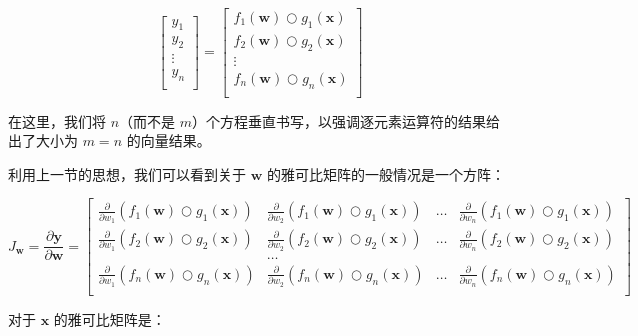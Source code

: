 \documentclass{ctexart}
\begin{document}
\[\begin{bmatrix}
           y_1\\
           y_2\\
           \vdots \\
           y_n\\
           \end{bmatrix} = \begin{bmatrix}
           f_{1}(\mathbf{w}) \bigcirc g_{1}(\mathbf{x})\\
           f_{2}(\mathbf{w}) \bigcirc g_{2}(\mathbf{x})\\
           \vdots \\
           f_{n}(\mathbf{w}) \bigcirc g_{n}(\mathbf{x})\\
         \end{bmatrix}\]

在这里，我们将 $n$（而不是 $m$）个方程垂直书写，以强调逐元素运算符的结果给出了大小为 $m=n$ 的向量结果。

利用上一节的思想，我们可以看到关于 $\mathbf{w}$ 的雅可比矩阵的一般情况是一个方阵：

\[J_\mathbf{w} = 
\frac{\partial \mathbf{y}}{\partial \mathbf{w}}  = \begin{bmatrix}
\frac{\partial}{\partial w_1} ( f_{1}(\mathbf{w}) \bigcirc g_{1}(\mathbf{x}) ) & \frac{\partial}{\partial w_2} ( f_{1}(\mathbf{w}) \bigcirc g_{1}(\mathbf{x}) ) & \ldots & \frac{\partial}{\partial w_n} ( f_{1}(\mathbf{w}) \bigcirc g_{1}(\mathbf{x}) )\\
\frac{\partial}{\partial w_1} ( f_{2}(\mathbf{w}) \bigcirc g_{2}(\mathbf{x}) ) & \frac{\partial}{\partial w_2} ( f_{2}(\mathbf{w}) \bigcirc g_{2}(\mathbf{x}) ) & \ldots & \frac{\partial}{\partial w_n} ( f_{2}(\mathbf{w}) \bigcirc g_{2}(\mathbf{x}) )\\
& \ldots\\
\frac{\partial}{\partial w_1} ( f_{n}(\mathbf{w}) \bigcirc g_{n}(\mathbf{x}) ) & \frac{\partial}{\partial w_2} ( f_{n}(\mathbf{w}) \bigcirc g_{n}(\mathbf{x}) ) & \ldots & \frac{\partial}{\partial w_n} ( f_{n}(\mathbf{w}) \bigcirc g_{n}(\mathbf{x}) )\\
\end{bmatrix}\]

对于 $\mathbf{x}$ 的雅可比矩阵是：
\end{document}
